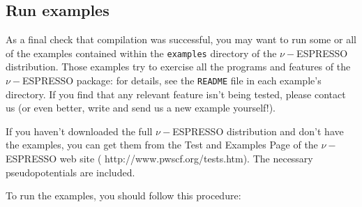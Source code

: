 \documentclass[12pt,a4paper]{article}
\begin{document}
\subsection{Run examples}
  \label{runexamples}

As a final check that compilation was successful, you may want to run
some or all of the examples contained within the \texttt{examples}
directory of the $\nu-$ESPRESSO distribution.
Those examples try to exercise all the programs and features of the
$\nu-$ESPRESSO package: for details, see the \texttt{README} file in each
example's directory.
If you find that any relevant feature isn't being tested, please
contact us (or even better, write and send us a new example
yourself!).

If you haven't downloaded the full $\nu-$ESPRESSO distribution and don't
have the examples, you can get them from the Test and Examples Page of
the $\nu-$ESPRESSO web site
(%
                   {http://www.pwscf.org/tests.htm}).
The necessary pseudopotentials are included.

To run the examples, you should follow this procedure:
\end{document}
